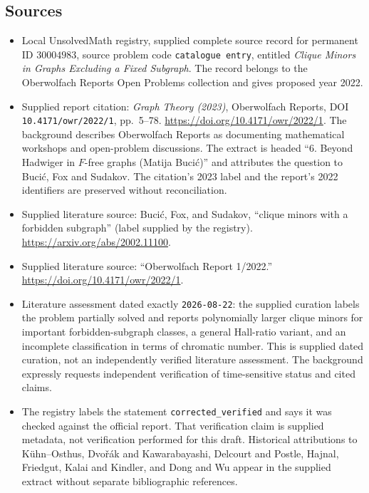 \documentclass[11pt]{article}
\begin{document}
\subsection{Sources}
\begin{itemize}
\item Local UnsolvedMath registry, supplied complete source record for permanent ID \(30004983\), source problem code \texttt{catalogue entry}, entitled \emph{Clique Minors in Graphs Excluding a Fixed Subgraph}. The record belongs to the Oberwolfach Reports Open Problems collection and gives proposed year 2022.
\item Supplied report citation: \emph{Graph Theory (2023)}, Oberwolfach Reports, DOI \texttt{10.4171/owr/2022/1}, pp.~5--78. \url{https://doi.org/10.4171/owr/2022/1}. The background describes Oberwolfach Reports as documenting mathematical workshops and open-problem discussions. The extract is headed ``6. Beyond Hadwiger in \(F\)-free graphs (Matija Bucić)'' and attributes the question to Bucić, Fox and Sudakov. The citation's 2023 label and the report's 2022 identifiers are preserved without reconciliation.
\item Supplied literature source: Bucić, Fox, and Sudakov, ``clique minors with a forbidden subgraph'' (label supplied by the registry). \url{https://arxiv.org/abs/2002.11100}.
\item Supplied literature source: ``Oberwolfach Report 1/2022.'' \url{https://doi.org/10.4171/owr/2022/1}.
\item Literature assessment dated exactly \texttt{2026-08-22}: the supplied curation labels the problem partially solved and reports polynomially larger clique minors for important forbidden-subgraph classes, a general Hall-ratio variant, and an incomplete classification in terms of chromatic number. This is supplied dated curation, not an independently verified literature assessment. The background expressly requests independent verification of time-sensitive status and cited claims.
\item The registry labels the statement \texttt{corrected\_verified} and says it was checked against the official report. That verification claim is supplied metadata, not verification performed for this draft. Historical attributions to Kühn--Osthus, Dvořák and Kawarabayashi, Delcourt and Postle, Hajnal, Friedgut, Kalai and Kindler, and Dong and Wu appear in the supplied extract without separate bibliographic references.
\end{itemize}
\end{document}
